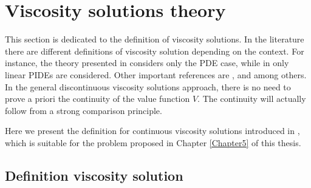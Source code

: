 \section{Viscosity solutions theory}\label{viscosity_solution_section}

This section is dedicated to the definition of viscosity solutions.
In the literature there are different definitions of viscosity solution depending on the context. 
For instance, the theory presented in \cite{Pham} considers only the PDE case, while in \cite{Cont}
only linear PIDEs are considered. 
Other important references are \cite{FlemingSoner}, \cite{Ph98} and \cite{BaIm08} among others.
In the general discontinuous viscosity solutions approach, there is no
need to prove a priori the continuity of the value function $V$. The continuity will actually follow from
a strong comparison principle. 

\noindent
Here we present the definition for continuous viscosity solutions introduced in \cite{Kab16}, which is suitable for the problem proposed in Chapter \ref{Chapter5} of this thesis.





\subsection{Definition viscosity solution}



